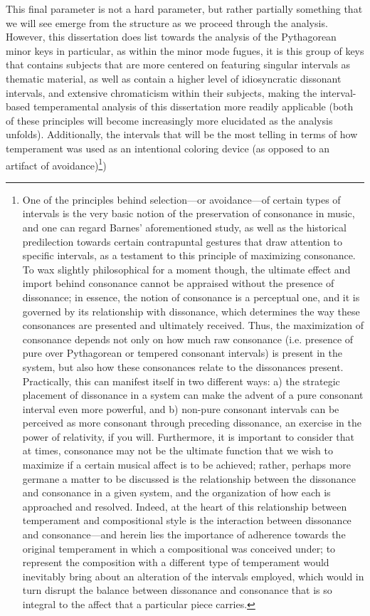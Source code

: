 This final parameter is not a hard parameter, but rather partially
something that we will see emerge from the structure as we proceed
through the analysis. However, this dissertation does list towards the
analysis of the Pythagorean minor keys in particular, as within the
minor mode fugues, it is this group of keys that contains subjects that
are more centered on featuring singular intervals as thematic material,
as well as contain a higher level of idiosyncratic dissonant intervals,
and extensive chromaticism within their subjects, making the
interval-based temperamental analysis of this dissertation more readily
applicable (both of these principles will become increasingly more
elucidated as the analysis unfolds). Additionally, the intervals that
will be the most telling in terms of how temperament was used as an
intentional coloring device (as opposed to an artifact of
avoidance)\footnote{One of the principles behind selection---or avoidance---of certain types of intervals is the very basic notion of the preservation of consonance in music, and one can regard Barnes’ aforementioned study, as well as the historical predilection towards certain contrapuntal gestures that draw attention to specific intervals, as a testament to this principle of maximizing consonance. To wax slightly philosophical for a moment though, the ultimate effect and import behind consonance cannot be appraised without the presence of dissonance; in essence, the notion of consonance is a perceptual one, and it is governed by its relationship with dissonance, which determines the way these consonances are presented and ultimately received. Thus, the maximization of consonance depends not only on how much raw consonance (i.e. presence of pure over Pythagorean or tempered consonant intervals) is present in the system, but also how these consonances relate to the dissonances present. Practically, this can manifest itself in two different ways: a) the strategic placement of dissonance in a system can make the advent of a pure consonant interval even more powerful, and b) non-pure consonant intervals can be perceived as more consonant through preceding dissonance, an exercise in the power of relativity, if you will. Furthermore, it is important to consider that at times, consonance may not be the ultimate function that we wish to maximize if a certain musical affect is to be achieved; rather, perhaps more germane a matter to be discussed is the relationship between the dissonance and consonance in a given system, and the organization of how each is approached and resolved. Indeed, at the heart of this relationship between temperament and compositional style is the interaction between dissonance and consonance—and herein lies the importance of adherence towards the original temperament in which a compositional was conceived under; to represent the composition with a different type of temperament would inevitably bring about an alteration of the intervals employed, which would in turn disrupt the balance between dissonance and consonance that is so integral to the affect that a particular piece carries.})
